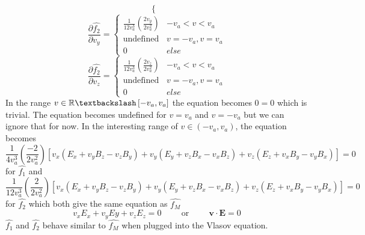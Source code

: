 \documentclass[12pt]{article}
\begin{document}
{\[\begin{cases}
	\end{cases}
	\]
	\[ \frac{\displaystyle \partial \hat{f_{2}}}{\displaystyle \partial v_{y}} = 
	\begin{cases} 
		\frac{1}{12 v_{a}^{3}} \left(\frac{2 v_{y}}{2 v_{a}^2}\right) & -v_{a} < v < v_{a} \\
		\mathrm{undefined} & v = - v_{a}, v = v_{a} \\
		0 & else 
	\end{cases}
	\]
	\[ \frac{\displaystyle \partial \hat{f_{2}}}{\displaystyle \partial v_{z}} = 
	\begin{cases} 
		\frac{1}{12 v_{a}^{3}} \left(\frac{2 v_{z}}{2 v_{a}^2}\right) & -v_{a} < v < v_{a} \\
		\mathrm{undefined} & v = - v_{a}, v = v_{a} \\
		0 & else 
	\end{cases}
	\]
	In the range $v \in \mathbb{R} \textbackslash \left[-v_{a}, v_{a}\right] $ the equation becomes $0 = 0$ which is trivial. The equation becomes undefined for $v = v_{a}$ and 
	$v = - v_{a}$ but we can ignore that for now. In the interesting range of $v \in \left(-v_{a}, v_{a}\right) $, the equation becomes 
	$$ \frac{1}{4 v_{a}^{3}} \left(\frac{- 2}{2 v_{a}^2}\right) \left[v_{x}\left( E_{x} + v_{y} B_{z} - v_{z} B_{y} \right) + v_{y} \left( E_{y} + v_{z} B_{x} - v_{x} B_{z} \right) + v_{z} \left(E_{z} + v_{x} B_{y} - v_{y} B_{x}\right) \right] = 0 $$
	for $\hat{f_{1}}$ and
	$$ \frac{1}{12 v_{a}^{3}} \left(\frac{2}{2 v_{a}^2}\right) \left[v_{x}\left( E_{x} + v_{y} B_{z} - v_{z} B_{y} \right) + v_{y} \left( E_{y} + v_{z} B_{x} - v_{x} B_{z} \right) + v_{z} \left(E_{z} + v_{x} B_{y} - v_{y} B_{x}\right) \right] = 0 $$
	for $\hat{f_{2}}$ which both give the same equation as $\widehat{f_{M}}$
	$$v_{x} E_{x} + v_{y} E{y} + v_{z} E_{z} = 0 \hspace{1cm}\mathrm{or}\hspace{1cm}\textbf{v} \cdot \mathrm{\textbf{E}} = 0$$
	\noindent $\hat{f_{1}}$ and $\hat{f_{2}}$ behave similar to $\hat{f_{M}}$ when plugged into the Vlasov equation.
		
}
\end{document}
